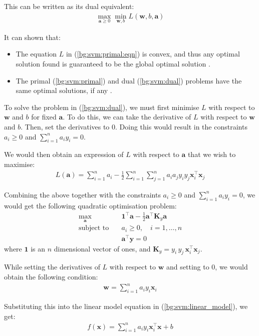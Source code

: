 \documentclass[12pt, twoside, a4paper]{article}
\def\vec{\boldsymbol}
\begin{document}
This can be written as its dual equivalent:
\begin{align}
\max_{\vec a \geq 0} \min_{\vec w, b} L(\vec w, b, \vec a) \label{bg:svm:dual}
\end{align}

It can shown that:
\begin{itemize}
\item The equation $L$ in (\ref{bg:svm:primal:eqn}) is convex, and thus any optimal solution found is guaranteed to be the global optimal solution \cite{RefWorks:123}.
\item The primal (\ref{bg:svm:primal}) and dual (\ref{bg:svm:dual}) problems have the same optimal solutions, if any \cite{RefWorks:124}.
\end{itemize}

To solve the problem in (\ref{bg:svm:dual}), we must first minimise $L$ with respect to $\vec w$ and $b$ for fixed $\vec a$. To do this, we can take the derivative of $L$ with respect to $\vec w$ and $b$. Then, set the derivatives to 0. Doing this would result in the constraints $a_i \geq 0$ and $\sum_{i=1}^n a_i y_i = 0$.

We would then obtain an expression of $L$ with respect to $\vec a$ that we wish to maximise:
\begin{align*}
L(\vec a) = \sum_{i=1}^n a_i - \frac{1}{2} \sum_{i=1}^n \sum_{j=1}^n a_i a_j y_i y_j \vec{x}_i^\top \vec{x}_j
\end{align*}

Combining the above together with the constraints $a_i \geq 0$ and $\sum_{i=1}^n a_i y_i = 0$, we would get the following quadratic optimisation problem:
\begin{align*}
\max_{\vec a} \quad &\vec{1}^\top \vec a - \frac{1}{2} \vec{a}^\top \vec{K}_y \vec{a} \\
\text{subject to} \quad &a_i \geq 0, \quad i = 1, \dots , n \\
&\vec{a}^\top \vec y = 0
\end{align*}
where $\vec{1}$ is an $n$ dimensional vector of ones, and $\vec{K}_y = y_i \, y_j \, \vec{x}_i^\top \vec{x}_j$.

While setting the derivatives of $L$ with respect to $\vec{w}$ and setting to 0, we would obtain the following condition:
\begin{align*}
\vec{w} = \sum_{i=1}^n a_i y_i \vec{x}_i
\end{align*}

Substituting this into the linear model equation in (\ref{bg:svm:linear_model}), we get:
\begin{align}
f(\vec{x}) = \sum_{i=1}^n a_i y_i \vec{x}_i^\top \vec{x} + b \label{bg:svm:decision}
\end{align}
\end{document}
